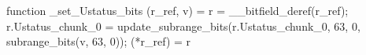 function _set_Ustatus_bits (r_ref, v) = {
    r = __bitfield_deref(r_ref);
    r.Ustatus_chunk_0 = update_subrange_bits(r.Ustatus_chunk_0, 63, 0, subrange_bits(v, 63, 0));
    (*r_ref) = r
}
